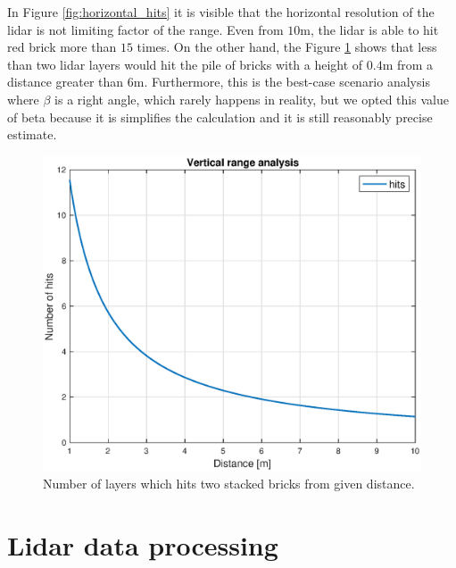 In Figure \ref{fig:horizontal_hits} it is visible that the horizontal resolution of the lidar is not limiting factor of the range. Even from $10$m, the lidar is able to hit red brick more than $15$ times. On the other hand, the Figure \ref{fig:vertical_hits} shows that less than two lidar layers would hit the pile of bricks with a height of $0.4$m from a distance greater than $6$m. Furthermore, this is the best-case scenario analysis where $\beta$ is a right angle, which rarely happens in reality, but we opted this value of beta because it is simplifies the calculation and it is still reasonably precise estimate.

\begin{figure}[H]
	\centering
	\includegraphics[scale=0.55]{fig/vertical_range.eps}
	\caption[Vertical range chart]{Number of layers which hits two stacked bricks from given distance.}
	\label{fig:vertical_hits}
\end{figure}

\section{Lidar data processing}

